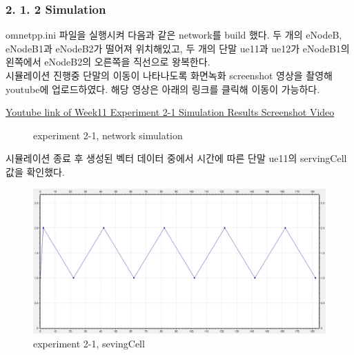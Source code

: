     \subsubsection*{2. 1. 2 Simulation}
    \vspace{-3mm}
        omnetpp.ini 파일을 실행시켜 다음과 같은 network를 build 했다. 두 개의 eNodeB, eNodeB1과 eNodeB2가 떨어져 위치해있고, 두 개의 단말 ue11과 ue12가  eNodeB1의 왼쪽에서  eNodeB2의 오른쪽을 직선으로 왕복한다. \\
        시뮬레이션 진행중 단말의 이동이 나타나도록 화면녹화 screenshot 영상을 촬영해 youtube에 업로드하였다. 해당 영상은 아래의 링크를 클릭해 이동이 가능하다.
        \vspace{-10mm}
            \begin{center}
                \item \href{https://www.youtube.com/watch?v=3oapMWzXq54&ab_channel=anamnesis}
            	{Youtube link of Week11 Experiment 2-1 Simulation Results Screenshot Video}
            \end{center}
        \vspace{-6mm}
        \begin{figure}[h!]
            \centering
            \hspace{3mm}
            \hspace{3mm}
            \caption{experiment 2-1, network simulation}
        \end{figure}
        시뮬레이션 종료 후 생성된 벡터 데이터 중에서 시간에 따른 단말 ue11의 servingCell 값을 확인했다.
        \begin{figure}[!h]\centering 
	        \includegraphics[width=.68\textwidth]{image/week11/2-1-3.png}
	        \caption{\footnotesize
	        experiment 2-1, sevingCell}
	        \vspace{-10pt}
        \end{figure}
